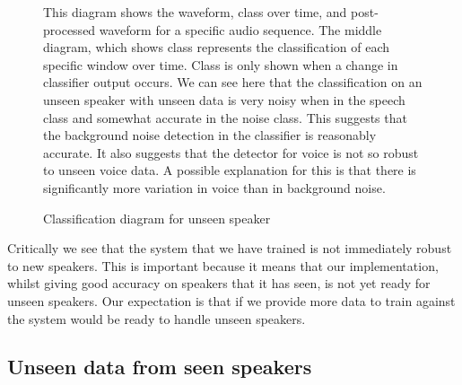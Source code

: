 \documentclass[ %
                    author={Sam Phippen},
                supervisor={Dr. Rafal Bogacz},
                     title={Real time voice activity detectors in noisy personal computing environments},
                  subtitle={},
                    degree={MEng},
                      year={2012} ]{thesis}
\begin{document}
\begin{figure}


    This diagram shows the waveform, class over time, and post-processed
    waveform for a specific audio sequence. The middle diagram, which shows
    class represents the classification of each specific window over time.
    Class is only shown when a change in classifier output occurs. We can see
    here that the classification on an unseen speaker with unseen data is very
    noisy when in the speech class and somewhat accurate in the noise class.
    This suggests that the background noise detection in the classifier is
    reasonably accurate. It also suggests that the detector for voice is not so
    robust to unseen voice data. A possible explanation for this is that there
    is significantly more variation in voice than in background noise.

    \caption{Classification diagram for unseen speaker}
    \label{fig:waveform_unseen}

\end{figure}

Critically we see that the system that we have trained is not immediately
robust to new speakers. This is important because it means that our
implementation, whilst giving good accuracy on speakers that it has seen, is
not yet ready for unseen speakers. Our expectation is that if we provide more
data to train against the system would be ready to handle unseen speakers.

\subsection{Unseen data from seen speakers}
\end{document}
